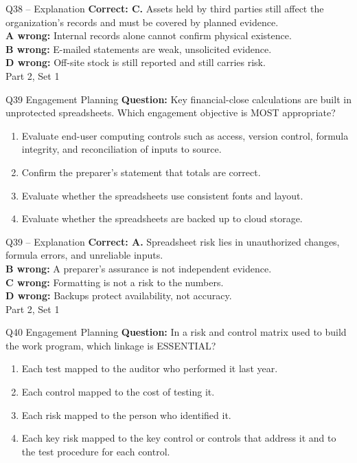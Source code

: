 \documentclass[aspectratio=169,10pt]{beamer}
\begin{document}
\begin{frame}[t]{Q38 -- Explanation}
	\footnotesize
	\textbf{Correct: C.} Assets held by third parties still affect the organization's records and must be covered by planned evidence. \\[5pt]
\textbf{A wrong:} Internal records alone cannot confirm physical existence. \\[3pt]
\textbf{B wrong:} E-mailed statements are weak, unsolicited evidence. \\[3pt]
\textbf{D wrong:} Off-site stock is still reported and still carries risk. \\[3pt]
	\vfill {\tiny Part 2, Set 1}
\end{frame}
\begin{frame}[t]{Q39 \hfill {\scriptsize Engagement Planning}}
	\small
	\textbf{Question:} Key financial-close calculations are built in unprotected spreadsheets. Which engagement objective is MOST appropriate?
	\begin{enumerate}[label=\Alph*.,itemsep=1pt,topsep=3pt]
			\item Evaluate end-user computing controls such as access, version control, formula integrity, and reconciliation of inputs to source.
			\item Confirm the preparer's statement that totals are correct.
			\item Evaluate whether the spreadsheets use consistent fonts and layout.
			\item Evaluate whether the spreadsheets are backed up to cloud storage.
	\end{enumerate}
\end{frame}
\begin{frame}[t]{Q39 -- Explanation}
	\footnotesize
	\textbf{Correct: A.} Spreadsheet risk lies in unauthorized changes, formula errors, and unreliable inputs. \\[5pt]
\textbf{B wrong:} A preparer's assurance is not independent evidence. \\[3pt]
\textbf{C wrong:} Formatting is not a risk to the numbers. \\[3pt]
\textbf{D wrong:} Backups protect availability, not accuracy. \\[3pt]
	\vfill {\tiny Part 2, Set 1}
\end{frame}
\begin{frame}[t]{Q40 \hfill {\scriptsize Engagement Planning}}
	\small
	\textbf{Question:} In a risk and control matrix used to build the work program, which linkage is ESSENTIAL?
	\begin{enumerate}[label=\Alph*.,itemsep=1pt,topsep=3pt]
			\item Each test mapped to the auditor who performed it last year.
			\item Each control mapped to the cost of testing it.
			\item Each risk mapped to the person who identified it.
			\item Each key risk mapped to the key control or controls that address it and to the test procedure for each control.
	\end{enumerate}
\end{frame}
\end{document}
